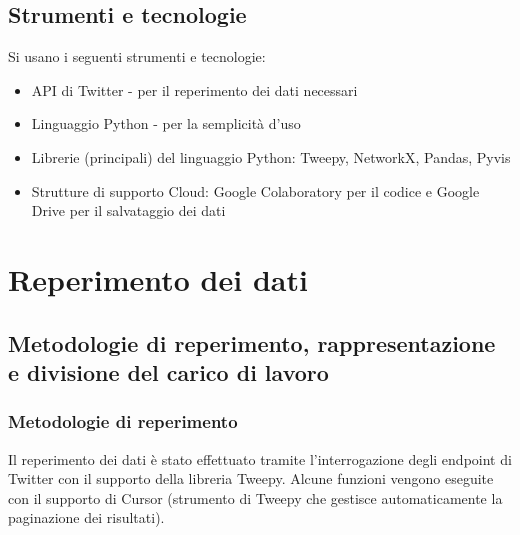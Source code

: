 \documentclass[a4paper, 12pt, twoside]{article}
\begin{document}
\subsection{Strumenti e tecnologie}
Si usano i seguenti strumenti e tecnologie:
\begin{itemize}
    \item API di Twitter - per il reperimento dei dati necessari
    \item Linguaggio Python - per la semplicità d’uso 
    \item Librerie (principali) del linguaggio Python: Tweepy, NetworkX, Pandas, Pyvis
    \item Strutture di supporto Cloud: Google Colaboratory per il codice e Google Drive per il salvataggio dei dati
\end{itemize}

\section{Reperimento dei dati} \label{sec:reperimento_dati}


\subsection{Metodologie di reperimento, rappresentazione e divisione del carico di lavoro}

\subsubsection{Metodologie di reperimento}
Il reperimento dei dati è stato effettuato tramite l’interrogazione degli endpoint di Twitter con il supporto della libreria Tweepy. Alcune funzioni vengono eseguite con il supporto di Cursor (strumento di Tweepy che gestisce automaticamente la paginazione dei risultati).
\end{document}

